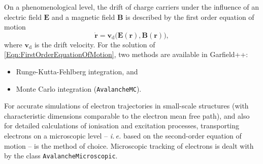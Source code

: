 On a phenomenological level, 
the drift of charge carriers under the influence of an 
electric field \(\mathbf{E}\) and a magnetic field \(\mathbf{B}\) 
is described by the first order equation of motion
\begin{equation}\label{Eqn:FirstOrderEquationOfMotion}
  \dot{\mathbf{r}} = 
  \mathbf{v}_{\text{d}}\bigl(\mathbf{E}\left(\mathbf{r}\right), 
                             \mathbf{B}\left(\mathbf{r}\right)\bigr),
\end{equation}
where \(\mathbf{v}_{\text{d}}\) is the drift velocity. 
For the solution of \eqref{Eqn:FirstOrderEquationOfMotion}, 
two methods are available in Garfield++:
\begin{itemize}
  \item
  Runge-Kutta-Fehlberg integration, and
  \item
  Monte Carlo integration (\texttt{AvalancheMC}).
\end{itemize}

For accurate simulations of electron trajectories 
in small-scale structures 
(with characteristic dimensions comparable to the electron mean free path),
and also for detailed calculations of ionisation and excitation processes, 
transporting electrons on a microscopic level -- 
\textit{i.\,e.} based on the second-order equation of motion --
is the method of choice. 
Microscopic tracking of electrons is dealt with by the class 
\texttt{AvalancheMicroscopic}.  
